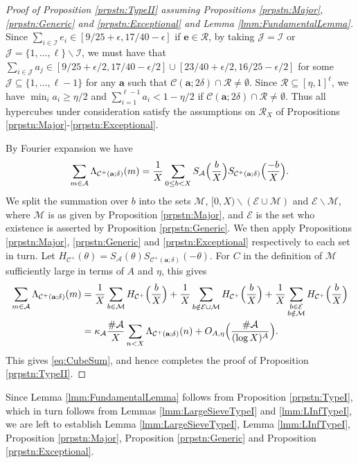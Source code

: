 \documentclass[10pt]{amsart}
\theoremstyle{plain}
\numberwithin{sblmm}{thrm}
\numberwithin{equation}{section}
\begin{document}
\begin{proof}[Proof of Proposition \ref{prpstn:TypeII} assuming Propositions \ref{prpstn:Major}, \ref{prpstn:Generic} and \ref{prpstn:Exceptional} and  Lemma \ref{lmm:FundamentalLemma}]
Since $\sum_{i\in\mathcal{I}}e_i\in[9/25+\epsilon,17/40-\epsilon]$ if $\mathbf{e}\in\mathcal{R}$, by taking $\mathcal{J}=\mathcal{I}$ or $\mathcal{J}=\{1,\dots,\ell\}\backslash\mathcal{I}$, we must have that $\sum_{i\in\mathcal{J}}a_j\in[9/25+\epsilon/2,17/40-\epsilon/2]\cup[23/40+\epsilon/2,16/25-\epsilon/2]$ for some $\mathcal{J}\subseteq\{1,\dots,\ell-1\}$ for any $\mathbf{a}$ such that $\mathcal{C}(\mathbf{a};2\delta)\cap\mathcal{R}\ne \emptyset$. Since $\mathcal{R}\subseteq[\eta,1]^\ell$, we have $\min_i a_i\ge \eta/2$ and $\sum_{i=1}^{\ell-1}a_i<1-\eta/2$ if $\mathcal{C}(\mathbf{a};2\delta)\cap\mathcal{R}\ne \emptyset$. Thus all hypercubes under consideration satisfy the assumptions on $\mathcal{R}_X$ of Propositions \ref{prpstn:Major}-\ref{prpstn:Exceptional}.

By Fourier expansion we have
\[
\sum_{m\in\mathcal{A}}\Lambda_{\mathcal{C}^+(\mathbf{a};\delta)}(m)=\frac{1}{X}\sum_{0\le b< X}S_{\mathcal{A}}\Bigl(\frac{b}{X}\Bigr)S_{\mathcal{C}^+(\mathbf{a};\delta)}\Bigl(\frac{-b}{X}\Bigr).
\]
We split the summation over $b$ into the sets $\mathcal{M}$, $[0,X)\backslash(\mathcal{E}\cup\mathcal{M})$ and $\mathcal{E}\backslash\mathcal{M}$, where $\mathcal{M}$ is as given by Proposition \ref{prpstn:Major}, and $\mathcal{E}$ is the set who existence is asserted by Proposition \ref{prpstn:Generic}. We then apply Propositions \ref{prpstn:Major}, \ref{prpstn:Generic} and \ref{prpstn:Exceptional} respectively to each set in turn. Let $H_{\mathcal{C}^+}(\theta)=S_{\mathcal{A}}(\theta)S_{\mathcal{C}^+(\mathbf{a};\delta)}(-\theta)$. For $C$ in the definition of $\mathcal{M}$ sufficiently large in terms of $A$ and $\eta$, this gives
%
\begin{align*}
\sum_{m\in\mathcal{A}}\Lambda_{\mathcal{C}^+(\mathbf{a};\delta)}(m)
&=\frac{1}{X}\sum_{b\in\mathcal{M}}H_{\mathcal{C}^+}\Bigl(\frac{b}{X}\Bigr)
+\frac{1}{X}\sum_{b\notin\mathcal{E}\cup\mathcal{M} }H_{\mathcal{C}^+}\Bigl(\frac{b}{X}\Bigr)
+\frac{1}{X}\sum_{\substack{b\in\mathcal{E}\\ b\notin \mathcal{M}}}H_{\mathcal{C}^+}\Bigl(\frac{b}{X}\Bigr)\\
&=\kappa_\mathcal{A}\frac{\#\mathcal{A}}{X}\sum_{n< X}\Lambda_{\mathcal{C}^+(\mathbf{a};\delta)}(n)+O_{A,\eta}\Bigl(\frac{\#\mathcal{A}}{(\log{X})^A}\Bigr).
\end{align*}
%
This gives \eqref{eq:CubeSum}, and hence completes the proof of Proposition \ref{prpstn:TypeII}.
%
\end{proof}
%
Since Lemma \ref{lmm:FundamentalLemma} follows from Proposition \ref{prpstn:TypeI}, which in turn follows from Lemmas \ref{lmm:LargeSieveTypeI} and \ref{lmm:LInfTypeI}, we are left to establish Lemma \ref{lmm:LargeSieveTypeI}, Lemma \ref{lmm:LInfTypeI}, Proposition \ref{prpstn:Major}, Proposition \ref{prpstn:Generic} and Proposition \ref{prpstn:Exceptional}.
\end{document}
